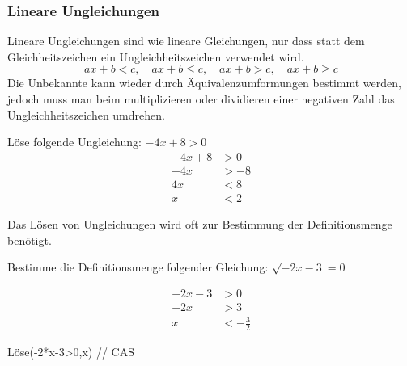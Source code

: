 \subsubsection{Lineare Ungleichungen}
Lineare Ungleichungen sind wie lineare Gleichungen, nur dass statt dem Gleichheitszeichen ein Ungleichheitszeichen verwendet wird.
\begin{equation}
    ax + b < c, \quad ax + b \le c, \quad ax + b > c, \quad ax + b \ge c
\end{equation}
Die Unbekannte kann wieder durch Äquivalenzumformungen bestimmt werden, jedoch muss man beim multiplizieren oder dividieren einer negativen Zahl das Ungleichheitszeichen umdrehen.
\begin{bsp}
    Löse folgende Ungleichung: \(-4x+8>0\)
    \begin{align*}        
        -4x+8&>0 \\
        -4x&>-8 \\
        4x&<8 \\
        x&<2
    \end{align*}
\end{bsp}
\noindent
Das Lösen von Ungleichungen wird oft zur Bestimmung der Definitionsmenge benötigt.
\begin{aufgabe}
    Bestimme die Definitionsmenge folgender Gleichung: \(\sqrt{-2x-3}=0\)
\end{aufgabe}
\begin{loesung}
\vspace{-12pt}
    \begin{align*}
        -2x-3&>0 \\
        -2x&>3 \\
        x&<-\frac{3}{2}
    \end{align*}
\end{loesung}
\begin{geogebracode}
    Löse(-2*x-3>0,x) // CAS
\end{geogebracode}
